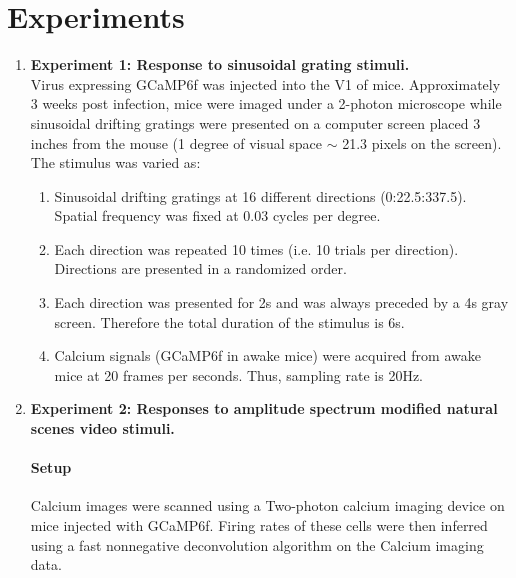 \documentclass[11pt]{article}
\begin{document}
\section{Experiments} %
\label{sub:experiment}
\begin{enumerate}
    \item \textbf{Experiment 1: Response to sinusoidal grating stimuli.}\\
    Virus expressing GCaMP6f was injected into the V1 of mice. Approximately 3 weeks post infection, mice were imaged under a 2-photon microscope while sinusoidal drifting gratings were presented on a computer screen placed 3 inches from the mouse (1 degree of visual space $\sim$ 21.3 pixels on the screen). The stimulus was varied as:
    \begin{enumerate}
        \item Sinusoidal drifting gratings at 16 different directions (0:22.5:337.5). Spatial frequency was fixed at 0.03 cycles per degree.
        \item Each direction was repeated 10 times (i.e. 10 trials per direction). Directions are presented in a randomized order.
        \item Each direction was presented for 2s and was always preceded by a 4s gray screen. Therefore the total duration of the stimulus is 6s.
        \item Calcium signals (GCaMP6f in awake mice) were acquired from awake mice at 20 frames per seconds. Thus, sampling rate is 20Hz.
    \end{enumerate}
    \item \textbf{Experiment 2: Responses to amplitude spectrum modified natural scenes video stimuli.}
    \paragraph{Setup} %
    \label{par:setup}
    Calcium images were scanned using a Two-photon calcium imaging device on mice injected with GCaMP6f. Firing rates of these cells were then inferred using a fast nonnegative deconvolution algorithm on the Calcium imaging data.\\

\end{enumerate}
\end{document}
